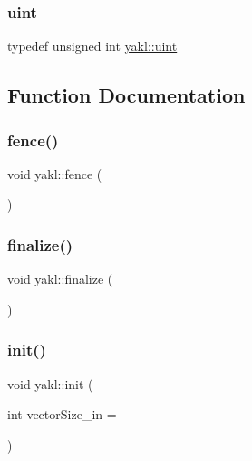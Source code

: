 \subsubsection{\texorpdfstring{uint}{uint}}
{\footnotesize\ttfamily typedef unsigned int \hyperlink{namespaceyakl_ad77ef6d92b742f4415930d8a33321ac7}{yakl\+::uint}}



\subsection{Function Documentation}
\mbox{\label{namespaceyakl_a5debd8fe5fff4f37c06e55648d138e0c}} 
\subsubsection{\texorpdfstring{fence()}{fence()}}
{\footnotesize\ttfamily void yakl\+::fence (\begin{DoxyParamCaption}{ }\end{DoxyParamCaption})\hspace{0.3cm}{\ttfamily [inline]}}

\mbox{\label{namespaceyakl_ab42370df4914644cfd129ff6037c5c9f}} 
\subsubsection{\texorpdfstring{finalize()}{finalize()}}
{\footnotesize\ttfamily void yakl\+::finalize (\begin{DoxyParamCaption}{ }\end{DoxyParamCaption})\hspace{0.3cm}{\ttfamily [inline]}}

\mbox{\label{namespaceyakl_afac5fb2f9440a6d7ee378941d8d58daa}} 
\subsubsection{\texorpdfstring{init()}{init()}}
{\footnotesize\ttfamily void yakl\+::init (\begin{DoxyParamCaption}\item[{int}]{vector\+Size\+\_\+in = {} }\end{DoxyParamCaption})\hspace{0.3cm}{\ttfamily [inline]}}

